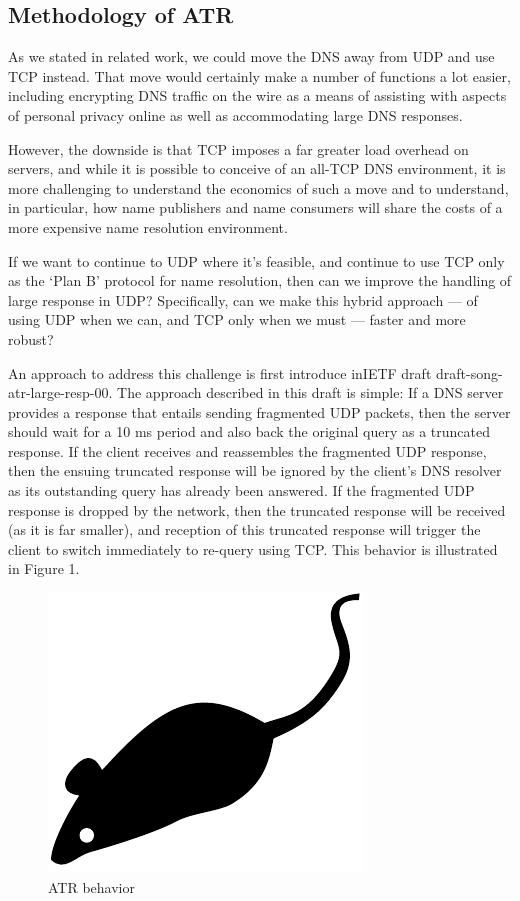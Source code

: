 \subsection{Methodology of ATR}

As we stated in related work, we could move the DNS away from UDP and use TCP instead. That move would certainly make a number of functions a lot easier, including encrypting DNS traffic on the wire as a means of assisting with aspects of personal privacy online as well as accommodating large DNS responses.

However, the downside is that TCP imposes a far greater load overhead on servers, and while it is possible to conceive of an all-TCP DNS environment, it is more challenging to understand the economics of such a move and to understand, in particular, how name publishers and name consumers will share the costs of a more expensive name resolution environment.

If we want to continue to UDP where it’s feasible, and continue to use TCP only as the ‘Plan B’ protocol for name resolution, then can we improve the handling of large response in UDP? Specifically, can we make this hybrid approach — of using UDP when we can, and TCP only when we must — faster and more robust?

An approach to address this challenge is first introduce inIETF draft draft-song-atr-large-resp-00. The approach described in this draft is simple: If a DNS server provides a response that entails sending fragmented UDP packets, then the server should wait for a 10 ms period and also back the original query as a truncated response. If the client receives and reassembles the fragmented UDP response, then the ensuing truncated response will be ignored by the client’s DNS resolver as its outstanding query has already been answered. If the fragmented UDP response is dropped by the network, then the truncated response will be received (as it is far smaller), and reception of this truncated response will trigger the client to switch immediately to re-query using TCP. This behavior is illustrated in Figure 1.

\begin{figure}[tp]
\centering
\includegraphics{figures/mouse}
\caption{ATR behavior}
\end{figure}

